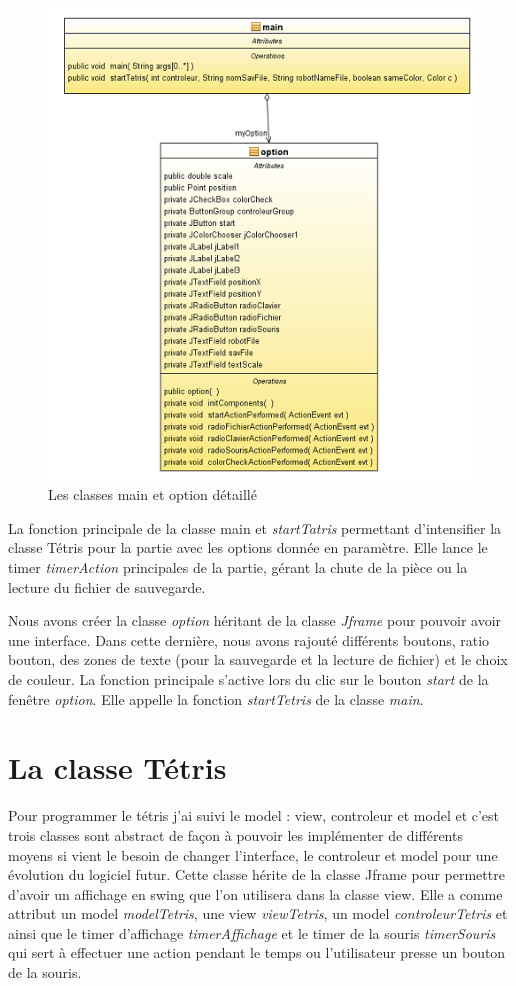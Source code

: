 \documentclass{article}           %
\begin{document}
\begin{figure}[h]
   \caption{Les classes main et option détaillé }
   \includegraphics{diagramMain.png}
\end{figure}

La fonction principale de la classe main et \emph{startTatris} permettant d'intensifier la classe Tétris pour la partie avec les options donnée en paramètre. Elle lance le timer \emph{timerAction} principales de la partie, gérant la chute de la pièce ou la lecture du fichier de sauvegarde.

Nous avons créer la classe \emph{option} héritant de la classe \emph{Jframe} pour pouvoir avoir une interface. Dans cette dernière, nous avons rajouté différents boutons, ratio bouton, des zones de texte (pour la sauvegarde et la lecture de fichier) et le choix de couleur.
La fonction principale s'active lors du clic sur le bouton \emph{start} de la fenêtre \emph{option}. Elle appelle la fonction \emph{startTetris} de la classe \emph{main}.

\section{La classe Tétris}
Pour programmer le tétris j'ai suivi le model : view, controleur et model et c'est trois classes sont abstract de façon à pouvoir les implémenter de différents moyens si vient le besoin de changer l'interface, le controleur et model pour une évolution du logiciel futur.
Cette classe hérite de la classe Jframe pour permettre d'avoir un affichage en swing que l'on utilisera dans la classe view. Elle a comme attribut un model \emph{modelTetris}, une view \emph{viewTetris}, un model \emph{controleurTetris} et ainsi que le timer d'affichage \emph{timerAffichage} et le timer de la souris \emph{timerSouris} qui sert à effectuer une action pendant le temps ou l'utilisateur presse un bouton de la souris.
\end{document}
